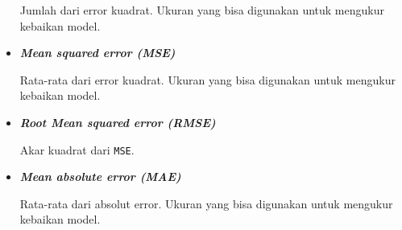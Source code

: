 \documentclass[
]{article}
\begin{document}
\begin{itemize}
  Jumlah dari error kuadrat. Ukuran yang bisa digunakan untuk mengukur
  kebaikan model.
\item
  \textbf{\emph{Mean squared error (MSE)}}

  Rata-rata dari error kuadrat. Ukuran yang bisa digunakan untuk
  mengukur kebaikan model.
\item
  \textbf{\emph{Root Mean squared error (RMSE)}}

  Akar kuadrat dari \texttt{MSE}.
\item
  \textbf{\emph{Mean absolute error (MAE)}}

  Rata-rata dari absolut error. Ukuran yang bisa digunakan untuk
  mengukur kebaikan model.
\end{itemize}
\end{document}
